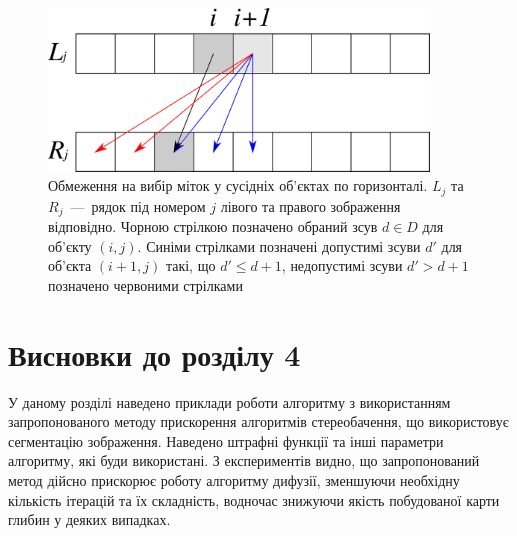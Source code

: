 \begin{figure}[h]
  \centering
  \includegraphics[width=0.9\textwidth]{images/disparity_restriction_edges}
  \caption{Обмеження на вибір міток у сусідніх об'єктах по горизонталі.
           $L_j$ та $R_j$~---~рядок під номером $j$
           лівого та правого зображення відповідно.
           Чорною стрілкою позначено обраний зсув $d \in D$ для об'єкту
           $\left(i, j \right)$.
           Синіми стрілками позначені допустимі зсуви $d'$
           для об'єкта $\left(i + 1, j \right)$ такі, що $d' \le d + 1$,
           недопустимі зсуви $d' > d + 1$ позначено червоними стрілками}
  \label{fig:disparity:restriction:edge}
\end{figure}

\section*{Висновки до розділу 4}

У даному розділі наведено приклади роботи алгоритму
з використанням запропонованого методу прискорення алгоритмів стереобачення,
що використовує сегментацію зображення.
Наведено штрафні функції та інші параметри алгоритму, які буди використані.
З експериментів видно, що запропонований метод дійсно прискорює роботу алгоритму дифузії,
зменшуючи необхідну кількість ітерацій та їх складність,
водночас знижуючи якість побудованої карти глибин у деяких випадках.
